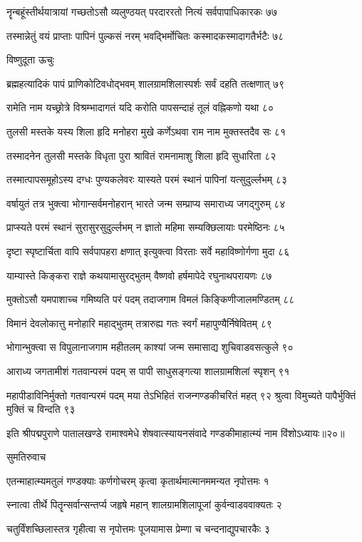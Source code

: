 नॄन्बहूंस्तीर्थयात्रायां गच्छतोऽसौ व्यलुण्ठयत्
परदाररतो नित्यं सर्वपापाधिकारकः ७७

तस्मान्नेतुं वयं प्राप्ताः पापिनं पुल्कसं नरम्
भवद्भिर्मोचितः कस्मादकस्मादागतैर्भटैः ७८

विष्णुदूता ऊचुः

ब्रह्महत्यादिकं पापं प्राणिकोटिवधोद्भवम्
शालग्रामशिलास्पर्शः सर्वं दहति तत्क्षणात् ७९

रामेति नाम यच्छ्रोत्रे विश्रम्भादागतं यदि
करोति पापसन्दाहं तूलं वह्निकणो यथा ८०

तुलसी मस्तके यस्य शिला हृदि मनोहरा
मुखे कर्णेऽथवा राम नाम मुक्तस्तदैव सः ८१

तस्मादनेन तुलसी मस्तके विधृता पुरा
श्रावितं रामनामाशु शिला हृदि सुधारिता ८२

तस्मात्पापसमूहोऽस्य दग्धः पुण्यकलेवरः
यास्यते परमं स्थानं पापिनां यत्सुदुर्ल्लभम् ८३

वर्षायुतं तत्र भुक्त्वा भोगान्सर्वमनोहरान्
भारते जन्म सम्प्राप्य समाराध्य जगद्गुरुम् ८४

प्राप्स्यते परमं स्थानं सुरासुरसुदुर्ल्लभम्
न ज्ञातो महिमा सम्यक्छिलायाः परमेष्ठिनः ८५

दृष्टा स्पृष्टार्चिता वापि सर्वपापहरा क्षणात्
इत्युक्त्वा विरताः सर्वे महाविष्णोर्गणा मुदा ८६

याम्यास्ते किङ्करा राज्ञे कथयामासुरद्भुतम्
वैष्णवो हर्षमापेदे रघुनाथपरायणः ८७

मुक्तोऽसौ यमपाशाच्च गमिष्यति परं पदम्
तदाजगाम विमलं किङ्किणीजालमण्डितम् ८८

विमानं देवलोकात्तु मनोहारि महाद्भुतम्
तत्रारुह्य गतः स्वर्गं महापुण्यैर्निषेवितम् ८९

भोगान्भुक्त्वा स विपुलानाजगाम महीतलम्
काश्यां जन्म समासाद्य शुचिवाडवसत्कुले ९०

आराध्य जगतामीशं गतवान्परमं पदम्
स पापी साधुसङ्गत्या शालग्रामशिलां स्पृशन् ९१

महापीडाविनिर्मुक्तो गतवान्परमं पदम्
मया तेऽभिहितं राजन्गण्डकीचरितं महत् ९२
श्रुत्वा विमुच्यते पापैर्भुक्तिं मुक्तिं च विन्दति ९३

इति श्रीपद्मपुराणे पातालखण्डे रामाश्वमेधे शेषवात्स्यायनसंवादे गण्डकीमाहात्म्यं नाम विंशोऽध्यायः॥२०॥


सुमतिरुवाच

एतन्माहात्म्यमतुलं गण्डक्याः कर्णगोचरम्
कृत्वा कृतार्थमात्मानममन्यत नृपोत्तमः १

स्नात्वा तीर्थे पितॄन्सर्वान्सन्तर्प्य जहृषे महान्
शालग्रामशिलापूजां कुर्वन्वाडववाक्यतः २

चतुर्विंशच्छिलास्तत्र गृहीत्वा स नृपोत्तमः
पूजयामास प्रेम्णा च चन्दनाद्युपचारकैः ३

